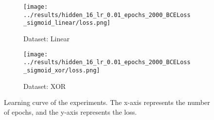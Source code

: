 \begin{figure}[H]
    \centering
    \begin{subfigure}[b]{0.45\textwidth}
        \centering
        \texttt{[image: ../results/hidden\_16\_lr\_0.01\_epochs\_2000\_BCELoss\_sigmoid\_linear/loss.png]}
        \caption{Dataset: Linear}
    \end{subfigure}
    \begin{subfigure}[b]{0.45\textwidth}
        \centering
        \texttt{[image: ../results/hidden\_16\_lr\_0.01\_epochs\_2000\_BCELoss\_sigmoid\_xor/loss.png]}
        \caption{Dataset: XOR}
    \end{subfigure}
    \caption{Learning curve of the experiments. The x-axis represents the number of epochs, and the y-axis represents the loss.}
\end{figure}
